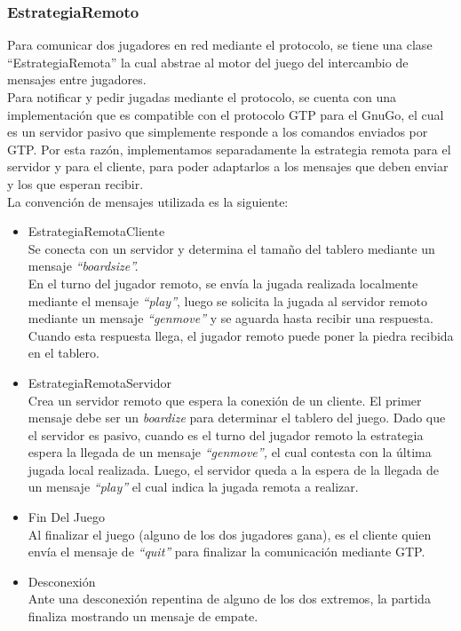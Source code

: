 \documentclass[11pt]{article}
\begin{document}
\subsubsection{EstrategiaRemoto}
\label{sec-4.2.1}

  Para comunicar dos jugadores en red mediante el protocolo, se tiene una clase ``EstrategiaRemota'' la cual
abstrae al motor del juego del intercambio de mensajes entre jugadores. \\
Para notificar y pedir jugadas mediante el protocolo, 
se cuenta con una implementaci\'on que es compatible con el protocolo GTP para el GnuGo, el cual es un 
servidor pasivo que simplemente responde a los comandos enviados por GTP. Por esta raz\'on, implementamos
separadamente la estrategia remota para el servidor y para el cliente, para poder adaptarlos a los mensajes
que deben enviar y los que esperan recibir. \\ 
La convenci\'on de mensajes utilizada es la siguiente: 
\begin{itemize}
 \item EstrategiaRemotaCliente \\
      Se conecta con un servidor y determina el tama\~no del tablero mediante un mensaje \textit{``boardsize''.}\\
      En el turno del jugador remoto, se env\'ia la jugada realizada localmente mediante el mensaje \textit{``play''}, 
      luego se solicita la jugada al servidor remoto mediante un mensaje\textit{ ``genmove''} y se aguarda hasta recibir una respuesta. 
      Cuando esta respuesta llega, el jugador remoto puede poner la piedra recibida en el tablero. 
 \item EstrategiaRemotaServidor\\
      Crea un servidor remoto que espera la conexi\'on de un cliente. El primer mensaje debe ser un \textit{boardize} para determinar el tablero del juego.
      Dado que el servidor es pasivo, cuando es el turno del jugador remoto la estrategia espera la llegada de un mensaje \textit{``genmove'',} 
      el cual contesta con la \'ultima jugada local realizada. Luego, el servidor queda a la espera de la llegada de un mensaje 
     \textit{ ``play''} el cual indica la jugada remota a realizar.
  \item Fin Del Juego\\
      Al finalizar el juego (alguno de los dos jugadores gana), es el cliente quien env\'ia el mensaje de \textit{``quit''} para finalizar
      la comunicaci\'on mediante GTP.
  \item Desconexi\'on\\
      Ante una desconexi\'on repentina de alguno de los dos extremos, la partida finaliza mostrando un mensaje de empate.
\end{itemize}
\end{document}
